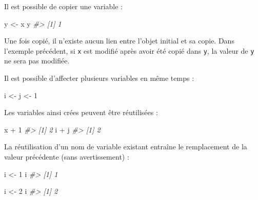 \documentclass[
  french,
]{scrbook}
\newenvironment{Shaded}{\begin{snugshade}}{\end{snugshade}}
\newcommand{\CommentTok}[1]{\textcolor[rgb]{0.56,0.35,0.01}{\textit{#1}}}
\newcommand{\DecValTok}[1]{\textcolor[rgb]{0.00,0.00,0.81}{#1}}
\newcommand{\NormalTok}[1]{#1}
\newcommand{\OtherTok}[1]{\textcolor[rgb]{0.56,0.35,0.01}{#1}}
\newcommand{\SpecialCharTok}[1]{\textcolor[rgb]{0.00,0.00,0.00}{#1}}
\begin{document}
Il est possible de copier une variable :

\begin{Shaded}
\begin{Highlighting}[]
\NormalTok{y }\OtherTok{\textless{}{-}}\NormalTok{ x}
\NormalTok{y}
\CommentTok{\#\textgreater{} [1] 1}
\end{Highlighting}
\end{Shaded}

Une fois copié, il n'existe aucun lien entre l'objet initial et sa copie. Dans l'exemple précédent, si \texttt{x} est modifié après avoir été copié dans \texttt{y}, la valeur de \texttt{y} ne sera pas modifiée.

Il est possible d'affecter plusieurs variables en même temps :

\begin{Shaded}
\begin{Highlighting}[]
\NormalTok{i }\OtherTok{\textless{}{-}}\NormalTok{ j }\OtherTok{\textless{}{-}} \DecValTok{1}
\end{Highlighting}
\end{Shaded}

Les variables ainsi crées peuvent être réutilisées :

\begin{Shaded}
\begin{Highlighting}[]
\NormalTok{x }\SpecialCharTok{+} \DecValTok{1}
\CommentTok{\#\textgreater{} [1] 2}
\NormalTok{i }\SpecialCharTok{+}\NormalTok{ j}
\CommentTok{\#\textgreater{} [1] 2}
\end{Highlighting}
\end{Shaded}

La réutilisation d'un nom de variable existant entraîne le remplacement de la valeur précédente (sans avertissement) :

\begin{Shaded}
\begin{Highlighting}[]
\NormalTok{i }\OtherTok{\textless{}{-}} \DecValTok{1}
\NormalTok{i}
\CommentTok{\#\textgreater{} [1] 1}

\NormalTok{i }\OtherTok{\textless{}{-}} \DecValTok{2}
\NormalTok{i}
\CommentTok{\#\textgreater{} [1] 2}
\end{Highlighting}
\end{Shaded}
\end{document}
